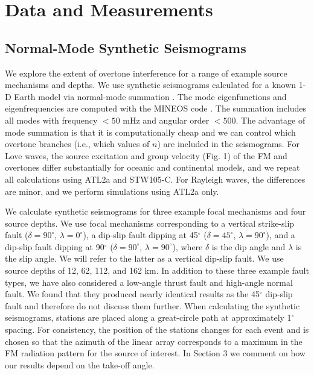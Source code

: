 \documentclass[extra,mreferee]{gji}
\begin{document}
\section{Data and Measurements}
\subsection{Normal-Mode Synthetic Seismograms }
We explore the extent of overtone interference for a range of example source mechanisms and depths. We use synthetic seismograms calculated for a known 1-D Earth model via normal-mode summation \citep{gilbert1971excitation}. The mode eigenfunctions and eigenfrequencies are computed with the MINEOS code \citep{mineosbro}. The summation includes all modes with frequency $< 50$ mHz and angular order $< 500$. The advantage of mode summation is that it is computationally cheap and we can control which overtone branches (i.e., which values of $n$) are included in the seismograms.
For Love waves, the source excitation and group velocity (Fig. 1) of the FM and overtones differ substantially  for oceanic and continental models, and we repeat all calculations using ATL2a and STW105-C. For Rayleigh waves, the differences are minor, and we perform simulations using ATL2a only. 

We calculate synthetic seismograms for three example focal mechanisms and four source depths. We use focal mechanisms corresponding to a vertical strike-slip fault ($\delta=90^\circ$, $\lambda=0^\circ$), a dip-slip fault dipping at 45$^\circ$ ($\delta=45^\circ$, $\lambda=90^\circ$), and a dip-slip fault dipping at 90$^\circ$ ($\delta=90^\circ$, $\lambda=90^\circ$), where $\delta$ is the dip angle and $\lambda$ is the slip angle. We will refer to the latter as a vertical dip-slip fault. We use source depths of 12, 62, 112, and 162 km. In addition to these three example fault types, we have also considered a low-angle thrust fault and high-angle normal fault. We found that they produced nearly identical results as the 45$^\circ$ dip-slip fault and therefore do not discuss them further. When calculating the synthetic seismograms, stations are placed along a great-circle path at approximately 1$^\circ$ spacing. For consistency, the position of the stations changes for each event and is chosen so that the azimuth of the linear array corresponds to a maximum in the FM radiation pattern for the source of interest. In Section 3 we comment on how our results depend on the take-off angle.  
\end{document}

